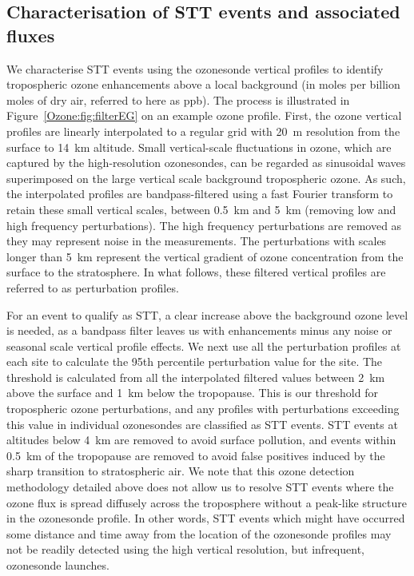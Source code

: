   \subsection{Characterisation of STT events and associated fluxes}
    \label{Ozone:CharacterisationOfSTTs}
    
    We characterise STT events using the ozonesonde vertical profiles to identify tropospheric ozone enhancements above a local background (in moles per billion moles of dry air, referred to here as ppb).
    The process is illustrated in Figure~\ref{Ozone:fig:filterEG} on an example ozone profile.
    First, the ozone vertical profiles are linearly interpolated to a regular grid with 20~m resolution from the surface to 14~km altitude. 
    Small vertical-scale fluctuations in ozone, which are captured by the high-resolution ozonesondes, can be regarded as sinusoidal waves superimposed on the large vertical scale background tropospheric ozone.
    As such, the interpolated profiles are bandpass-filtered using a fast Fourier transform \citep{Press1992} to retain these small vertical scales, between 0.5~km and 5~km (removing low and high frequency perturbations).
    The high frequency perturbations are removed as they may represent noise in the measurements.
    The perturbations with scales longer than 5~km represent the vertical gradient of ozone concentration from the surface to the stratosphere.
    In what follows, these filtered vertical profiles are referred to as perturbation profiles.
    
    For an event to qualify as STT, a clear increase above the background ozone level is needed, as a bandpass filter leaves us with enhancements minus any noise or seasonal scale vertical profile effects.
    We next use all the perturbation profiles at each site to calculate the 95th percentile perturbation value for the site.
    The threshold is calculated from all the interpolated filtered values between 2~km above the surface and 1~km below the tropopause.
    This is our threshold for tropospheric ozone perturbations, and any profiles with perturbations exceeding this value in individual ozonesondes are classified as STT events.
    STT events at altitudes below 4~km are removed to avoid surface pollution, and events within 0.5~km of the tropopause are removed to avoid false positives induced by the sharp transition to stratospheric air.
    We note that this ozone detection methodology detailed above does not allow us to resolve STT events where the ozone flux is spread diffusely across the troposphere without a peak-like structure in the ozonesonde profile. 
    In other words, STT events which might have occurred some distance and time away from the location of the ozonesonde profiles may not be readily detected using the high vertical resolution, but infrequent, ozonesonde launches.
    
